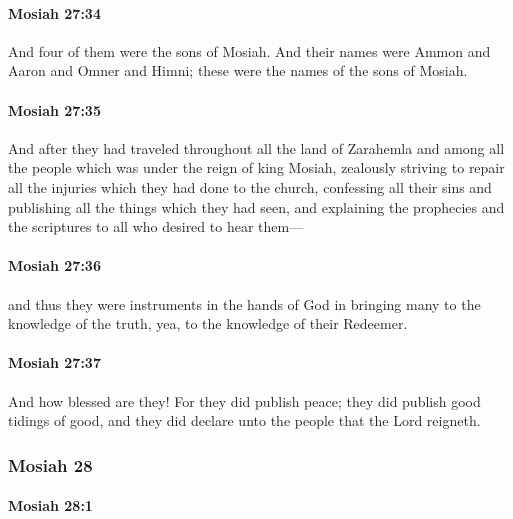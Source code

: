 		\paragraph{Mosiah 27:34} %
			\label{MOSIAH-27-34}

			And four of them were the sons of Mosiah.
			And their names were Ammon and Aaron and Omner and Himni;
			these were the names of the sons of Mosiah.

		\paragraph{Mosiah 27:35} %
			\label{MOSIAH-27-35}

			And after they had traveled throughout all the land of Zarahemla
			and among all the people which was under the reign of king Mosiah,
			zealously striving to repair all the injuries which they had done to the church,
			confessing all their sins and publishing all the things which they had seen,
			and explaining the prophecies and the scriptures to all who desired to hear them---

		\paragraph{Mosiah 27:36} %
			\label{MOSIAH-27-36}

			and thus they were instruments in the hands of God
			in bringing many to the knowledge of the truth,
			yea, to the knowledge of their Redeemer.

		\paragraph{Mosiah 27:37} %
			\label{MOSIAH-27-37}

			And how blessed are they!
			For they did publish peace;
			they did publish good tidings of good,
			and they did declare unto the people that the Lord reigneth.

	\subsubsection{Mosiah 28} %
		\label{MOSIAH-28}
		
		\paragraph{Mosiah 28:1} %
			\label{MOSIAH-28-1}

